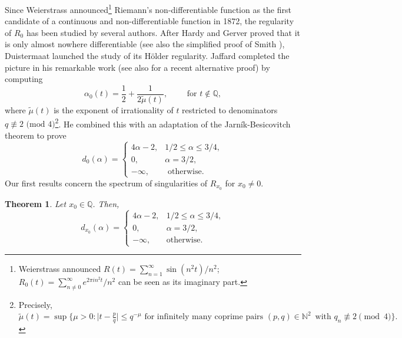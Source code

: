\documentclass[11pt,reqno]{amsart}
\newtheorem{thm}{Theorem}[section]
\theoremstyle{definition}
\begin{document}
Since Weierstrass  \cite{Weierstrass1872} announced\footnote{
Weierstrass announced $R(t) = \sum_{n=1}^\infty \sin (n^2 t)/n^2$;
$R_0(t) = \sum_{n \neq 0}^\infty e^{2\pi i n^2 t}/n^2$ can be seen as its imaginary part.
} Riemann's non-differentiable function as the first candidate of a continuous and non-differentiable function in 1872, 
the regularity of $R_0$ has been studied by several authors.   
After Hardy \cite{Hardy1916} and Gerver \cite{Gerver1970,Gerver1971} proved that it is only almost nowhere differentiable (see also the simplified proof of Smith \cite{Smith1972}), Duistermaat \cite{Duistermaat1991} launched the study of its H\"older regularity. 
Jaffard completed the picture in his remarkable work \cite[Theorem 1]{Jaffard1996} (see also \cite{BrouckeVindas2021} for a recent alternative proof) by computing 
\begin{equation}\label{eq:Holder_For_Riemann}
\alpha_0(t) = \frac12 + \frac{1}{2\widetilde{\mu}(t)}, \qquad \text{ for } t \not\in \mathbb Q, 
\end{equation}
where
$\widetilde \mu(t)$ is the exponent of irrationality of $t$ restricted to denominators $q \not\equiv 2 \text{ (mod } 4)$\footnote{
Precisely, 
$\widetilde\mu(t) = \sup \{     \mu > 0 :  \big| t - \frac{p}{q} \big| \leq q^{-\mu} \text{ for infinitely many coprime pairs } (p,q) \in \mathbb N^2 \, 
\text{ with } q_n \not\equiv 2 \pmod{4}   \}.$
}. 
He combined this with an adaptation of the Jarn\'ik-Besicovitch theorem to prove
\begin{equation}\label{eq:Spectrum_At_0}
d_0(\alpha) = 
\left\{  
\begin{array}{ll}
4\alpha - 2, & 1/2 \leq \alpha \leq 3/4, \\
0, & \alpha = 3/2, \\
-\infty, & \text{ otherwise.}
\end{array}
\right. 
\end{equation}
Our first results concern the spectrum of singularities of $R_{x_0}$ for $x_0 \neq 0$. 
\begin{thm}\label{thm:Main_Theorem_Rationals_Spectrum}
Let $x_0 \in \mathbb Q$.
Then, 
\begin{equation}
d_{x_0}(\alpha) = 
\left\{
\begin{array}{ll}
4  \alpha - 2, & 1/2 \leq \alpha \leq 3/4, \\
0, & \alpha = 3/2, \\
-\infty, & \text{otherwise.}
\end{array} \right.
\end{equation}
\end{thm}
\end{document}
